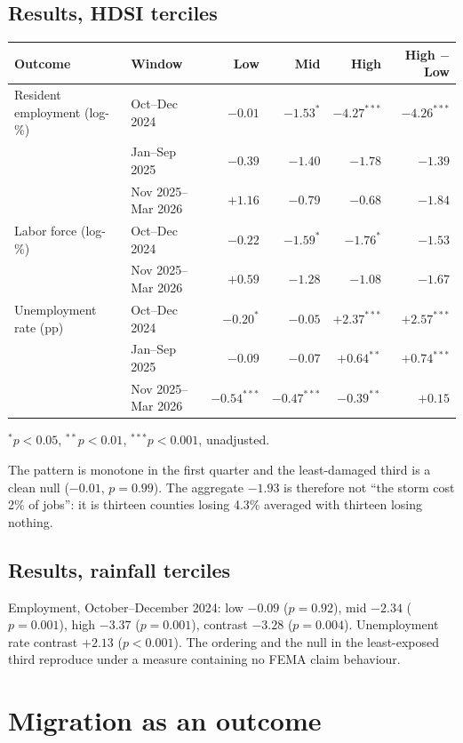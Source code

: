 \documentclass[11pt,a4paper]{article}
\newcommand{\lp}{log-\%}
\begin{document}
\subsection{Results, HDSI terciles}
\begin{center}\small
\begin{tabular}{llrrrr}
\toprule
Outcome & Window & Low & Mid & High & High $-$ Low\\
\midrule
Resident employment (\lp) & Oct--Dec 2024 & $-0.01$ & $-1.53^{*}$ & $-4.27^{***}$ & $-4.26^{***}$\\
 & Jan--Sep 2025 & $-0.39$ & $-1.40$ & $-1.78$ & $-1.39$\\
 & Nov 2025--Mar 2026 & $+1.16$ & $-0.79$ & $-0.68$ & $-1.84$\\
Labor force (\lp) & Oct--Dec 2024 & $-0.22$ & $-1.59^{*}$ & $-1.76^{*}$ & $-1.53$\\
 & Nov 2025--Mar 2026 & $+0.59$ & $-1.28$ & $-1.08$ & $-1.67$\\
Unemployment rate (pp) & Oct--Dec 2024 & $-0.20^{*}$ & $-0.05$ & $+2.37^{***}$ & $+2.57^{***}$\\
 & Jan--Sep 2025 & $-0.09$ & $-0.07$ & $+0.64^{**}$ & $+0.74^{***}$\\
 & Nov 2025--Mar 2026 & $-0.54^{***}$ & $-0.47^{***}$ & $-0.39^{**}$ & $+0.15$\\
\bottomrule
\end{tabular}
\end{center}
{\footnotesize $^{*}p<0.05$, $^{**}p<0.01$, $^{***}p<0.001$, unadjusted.}

The pattern is monotone in the first quarter and the least-damaged third is a clean null
($-0.01$, $p=0.99$). The aggregate $-1.93$ is therefore not ``the storm cost 2\% of jobs'': it is
thirteen counties losing 4.3\% averaged with thirteen losing nothing.

\subsection{Results, rainfall terciles}
Employment, October--December 2024: low $-0.09$ ($p=0.92$), mid $-2.34$ ($p=0.001$), high $-3.37$
($p=0.001$), contrast $-3.28$ ($p=0.004$). Unemployment rate contrast $+2.13$ ($p<0.001$). The ordering
and the null in the least-exposed third reproduce under a measure containing no FEMA claim behaviour.

\section{Migration as an outcome}
\end{document}
